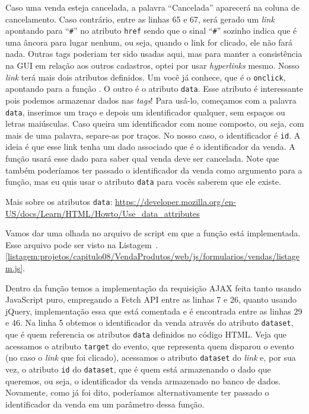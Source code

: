 Caso uma venda esteja cancelada, a palavra ``Cancelada'' aparecerá na coluna de cancelamento. Caso contrário, entre as linhas 65 e 67, será gerado um \textit{link} apontando para ``\texttt{\#}'' no atributo \texttt{href} sendo que o sinal ``\texttt{\#}'' sozinho indica que é uma âncora para lugar nenhum, ou seja, quando o link for clicado, ele não fará nada. Outras tags poderiam ter sido usadas aqui, mas para manter a consistência na GUI em relação aos outros cadastros, optei por usar \textit{hyperlinks} mesmo. Nosso \textit{link} terá mais dois atributos definidos. Um você já conhece, que é o \texttt{onclick}, apontando para a função . O outro é o atributo \texttt{data}. Esse atributo é interessante pois podemos armazenar dados nas \textit{tags}! Para usá-lo, começamos com a palavra \texttt{data}, inserimos um traço e depois um identificador qualquer, sem espaços ou letras maiúsculas. Caso queira um identificador com nome composto, ou seja, com mais de uma palavra, separe-as por traços. No nosso caso, o identificador é \texttt{id}. A ideia é que esse link tenha um dado associado que é o identificador da venda. A função  usará esse dado para saber qual venda deve ser cancelada. Note que também poderíamos ter passado o identificador da venda como argumento para a função, mas eu quis usar o atributo \texttt{data} para vocês saberem que ele existe.

\begin{saibaMais}
    Mais sobre os atributos \texttt{data}: \url{https://developer.mozilla.org/en-US/docs/Learn/HTML/Howto/Use_data_attributes}
\end{saibaMais}

Vamos dar uma olhada no arquivo de script em que a função  está implementada. Esse arquivo pode ser visto na Listagem~\thechapter.\ref{listagem:projetos/capitulo08/VendaProdutos/web/js/formularios/vendas/listagem.js}.


Dentro da função temos a implementação da requisição AJAX feita tanto usando JavaScript puro, empregando a Fetch API entre as linhas 7 e 26, quanto usando jQuery, implementação essa que está comentada e é encontrada entre as linhas 29 e 46. Na linha 5 obtemos o identificador da venda através do atributo \texttt{dataset}, que é quem referencia os atributos \texttt{data} definidos no código HTML. Veja que acessamos o atributo \texttt{target} do evento, que representa quem disparou o evento (no caso o \textit{link} que foi clicado), acessamos o atributo \texttt{dataset} do \textit{link} e, por sua vez, o atributo \texttt{id} do \texttt{dataset}, que é quem está armazenando o dado que queremos, ou seja, o identificador da venda armazenado no banco de dados. Novamente, como já foi dito, poderíamos alternativamente ter passado o identificador da venda em um parâmetro dessa função.


